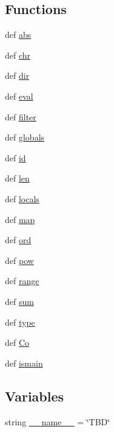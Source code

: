 \subsection*{Functions}
\begin{DoxyCompactItemize}
\item 
def \hyperlink{namespace____bi_a392ed75f00d0e97c8c5b9cf710347ae1}{abs}
\item 
def \hyperlink{namespace____bi_a91dfff86962ea96aaa37e0c3228b0c12}{chr}
\item 
def \hyperlink{namespace____bi_aafd2c7caae3ab0b314887c005c2a8426}{dir}
\item 
def \hyperlink{namespace____bi_a90c07e0375ae4dd1caf9944cc781b333}{eval}
\item 
def \hyperlink{namespace____bi_a7dccd06c09c45af61d3fac77e84b2166}{filter}
\item 
def \hyperlink{namespace____bi_a9651b2e728ff0743ed32bdcad7d6c358}{globals}
\item 
def \hyperlink{namespace____bi_a3a2b1bfdba24b945379692813ca164a3}{id}
\item 
def \hyperlink{namespace____bi_a39a4ae10474e5e94d339db8a8a0ad0be}{len}
\item 
def \hyperlink{namespace____bi_afa1c484906a78716f7f98752e2666fae}{locals}
\item 
def \hyperlink{namespace____bi_ad7d6a1a1a735c43396c981f33674cd48}{map}
\item 
def \hyperlink{namespace____bi_a468dd299e29007c55f9da7bf67ccb943}{ord}
\item 
def \hyperlink{namespace____bi_a6d23971863e9d8073b5667bf327cd802}{pow}
\item 
def \hyperlink{namespace____bi_a1040779a3e2c7ab3ab9e6f4b98f3ac3a}{range}
\item 
def \hyperlink{namespace____bi_a77c9daccea4eed8cb074a540cdb42c88}{sum}
\item 
def \hyperlink{namespace____bi_a25420df74fdf02ffe8bebd57c6f264d7}{type}
\item 
def \hyperlink{namespace____bi_aafd3484d98d0ae11bef48de709f1f9ec}{Co}
\item 
def \hyperlink{namespace____bi_ac5b5dece7f29c8bf939f189c01ea993a}{ismain}
\end{DoxyCompactItemize}
\subsection*{Variables}
\begin{DoxyCompactItemize}
\item 
string \hyperlink{namespace____bi_a93aaf40f6c01f591e7a8f2971ae812fe}{\-\_\-\-\_\-name\-\_\-\-\_\-} = \char`\"{}T\-B\-D\char`\"{}
\end{DoxyCompactItemize}


